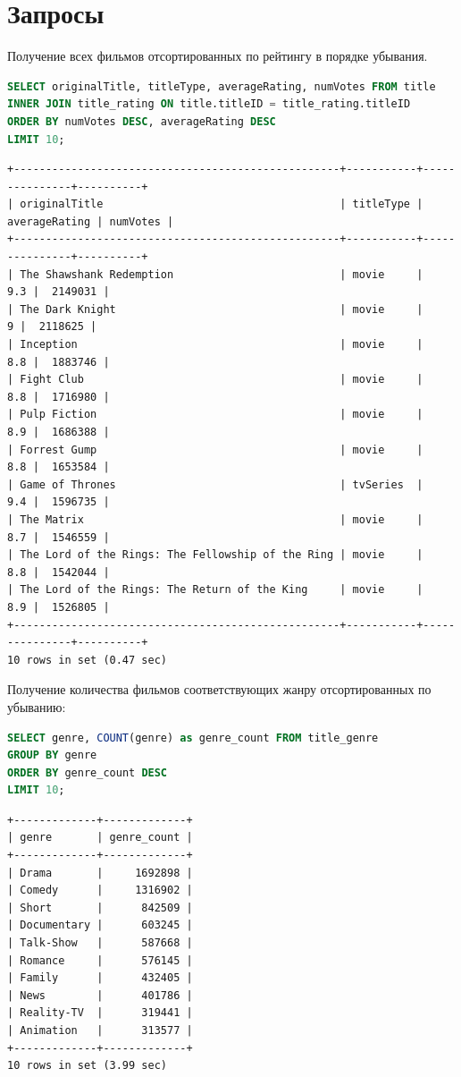 \documentclass[12pt,a4paper]{article}
\begin{document}
\section{Запросы}
Получение всех фильмов отсортированных по рейтингу в порядке убывания.
\begin{lstlisting}[language=SQL]
SELECT originalTitle, titleType, averageRating, numVotes FROM title
INNER JOIN title_rating ON title.titleID = title_rating.titleID
ORDER BY numVotes DESC, averageRating DESC
LIMIT 10;
\end{lstlisting}
\begin{lstlisting}[basicstyle = \tiny\ttfamily, columns = fixed]
+---------------------------------------------------+-----------+---------------+----------+
| originalTitle                                     | titleType | averageRating | numVotes |
+---------------------------------------------------+-----------+---------------+----------+
| The Shawshank Redemption                          | movie     |           9.3 |  2149031 |
| The Dark Knight                                   | movie     |             9 |  2118625 |
| Inception                                         | movie     |           8.8 |  1883746 |
| Fight Club                                        | movie     |           8.8 |  1716980 |
| Pulp Fiction                                      | movie     |           8.9 |  1686388 |
| Forrest Gump                                      | movie     |           8.8 |  1653584 |
| Game of Thrones                                   | tvSeries  |           9.4 |  1596735 |
| The Matrix                                        | movie     |           8.7 |  1546559 |
| The Lord of the Rings: The Fellowship of the Ring | movie     |           8.8 |  1542044 |
| The Lord of the Rings: The Return of the King     | movie     |           8.9 |  1526805 |
+---------------------------------------------------+-----------+---------------+----------+
10 rows in set (0.47 sec)
\end{lstlisting}
Получение количества фильмов соответствующих жанру отсортированных по убыванию:
\begin{lstlisting}[language=SQL]
SELECT genre, COUNT(genre) as genre_count FROM title_genre
GROUP BY genre
ORDER BY genre_count DESC
LIMIT 10;
\end{lstlisting}
\begin{lstlisting}[basicstyle = \tiny\ttfamily, columns = fixed]
+-------------+-------------+
| genre       | genre_count |
+-------------+-------------+
| Drama       |     1692898 |
| Comedy      |     1316902 |
| Short       |      842509 |
| Documentary |      603245 |
| Talk-Show   |      587668 |
| Romance     |      576145 |
| Family      |      432405 |
| News        |      401786 |
| Reality-TV  |      319441 |
| Animation   |      313577 |
+-------------+-------------+
10 rows in set (3.99 sec)
\end{lstlisting}
\end{document}
